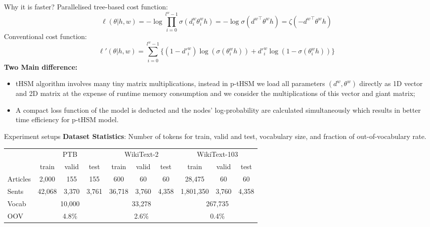 \documentclass[final,t,unknownkeysallowed]{beamer}
\begin{document}
\begin{frame}{}
\begin{columns}[t]
\begin{column}{.3\linewidth}
	\begin{block}{Why it is faster?}
Parallelised tree-based cost function:
    \begin{equation}
   \ell(\theta|h,w) =-\log\prod_{i=0}^{l^w -1} \sigma(d_i^w \theta_{i}^w h) = -\log \sigma({d^w}^\top \theta^w h)=  \zeta(- {d^w}^\top \theta^w h )
    \end{equation}
    Conventional cost function:
    \begin{equation}
    \ell'(\theta|h,w) =\sum_{i=0}^{l^w-1} \{(1-d'^w_i)\log (\sigma(\theta_{i}^w h))  + {d'^w_i}\log (1-\sigma (\theta_{i}^w h))\}
    \end{equation}
    \textbf{Two Main difference:}
	\begin{itemize}
	\item tHSM algorithm involves many tiny matrix multiplications, instead in p-tHSM we load all parameters $(d^w, \theta^w)$ directly as 1D vector and 2D matrix at the expense of runtime memory consumption and we consider the multiplications of this vector and giant matrix;
    \item A compact loss function of the model is deducted and the nodes' log-probability are calculated simultaneously which results in better time efficiency for p-tHSM model.
	\end{itemize}
      \end{block}
      \begin{block}{Experiment setups}
      \textbf{Dataset Statistics}: Number of tokens for train, valid and test, vocabulary size, and fraction of out-of-vocabulary rate.
      \begin{table}
      
        \setlength{\abovecaptionskip}{0pt}
        \setlength{\abovedisplayskip}{0pt}
        \centering
        \begin{tabular}{l|ccc|ccc|ccc}
        \toprule
        &\multicolumn{3}{c|}{PTB}&\multicolumn{3}{c|}{WikiText-2}&\multicolumn{3}{c}{WikiText-103}  \\
        &train& valid&test&train& valid&test&train & valid &test\\ \midrule
        Articles  & 2,000& 155& 155& 600& 60& 60& 28,475& 60 & 60\\
        Sents & 42,068   & 3,370  & 3,761 &36,718   & 3,760 & 4,358& 1,801,350   & 3,760 & 4,358 \\\midrule
        Vocab &\multicolumn{3}{c|}{10,000}&\multicolumn{3}{c|}{33,278} & \multicolumn{3}{c}{ 267,735}\\
        OOV &\multicolumn{3}{c|}{4.8\% }&\multicolumn{3}{c|}{2.6\% } & \multicolumn{3}{c}{0.4\%} \\
        \bottomrule
        \end{tabular}
       \end{table}
       

\end{block}
\end{column}
\end{columns}
\end{frame}
\end{document}
